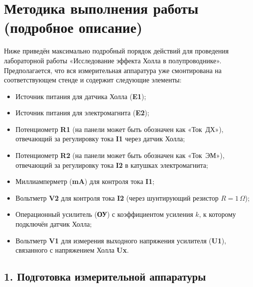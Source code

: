\documentclass[12pt,a4paper]{article}
\begin{document}
\section*{Методика выполнения работы (подробное описание)}

Ниже приведён максимально подробный порядок действий для проведения лабораторной работы «Исследование эффекта Холла в полупроводнике». Предполагается, что вся измерительная аппаратура уже смонтирована на соответствующем стенде и содержит следующие элементы:
\begin{itemize}
    \item Источник питания для датчика Холла (\textbf{E1});
    \item Источник питания для электромагнита (\textbf{E2});
    \item Потенциометр \textbf{R1} (на панели может быть обозначен как «Ток~ДХ»), отвечающий за регулировку тока \textbf{I1} через датчик Холла;
    \item Потенциометр \textbf{R2} (на панели может быть обозначен как «Ток~ЭМ»), отвечающий за регулировку тока \textbf{I2} в катушках электромагнита;
    \item Миллиамперметр (\textbf{mA}) для контроля тока \textbf{I1};
    \item Вольтметр \textbf{V2} для контроля тока \textbf{I2} (через шунтирующий резистор $R=1\,\Omega$);
    \item Операционный усилитель (\textbf{ОУ}) с коэффициентом усиления $k$, к которому подключён датчик Холла;
    \item Вольтметр \textbf{V1} для измерения выходного напряжения усилителя (\textbf{U1}), связанного с напряжением Холла \textbf{Ux}.
\end{itemize}

\subsection*{1. Подготовка измерительной аппаратуры}
\end{document}
